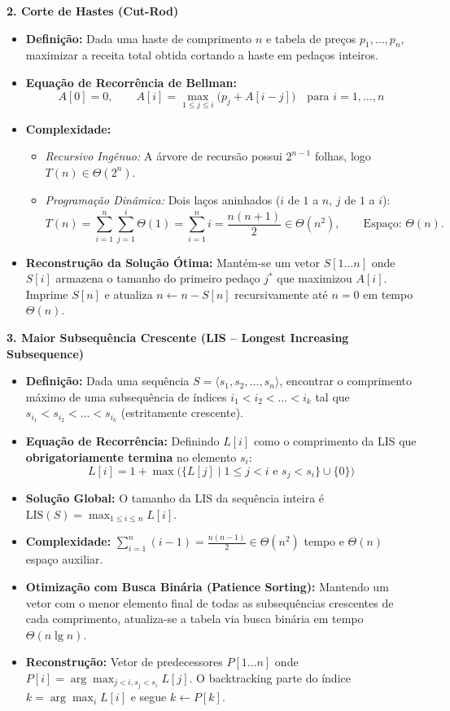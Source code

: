 \documentclass[11pt,a4paper]{article}
\newcommand{\topico}[1]{\par\medskip\textbf{\color{azul}#1}\par}
\begin{document}
\topico{2. Corte de Hastes (Cut-Rod)}
\begin{itemize}
  \item \textbf{Definição:} Dada uma haste de comprimento $n$ e tabela de preços $p_1, \dots, p_n$, maximizar a receita total obtida cortando a haste em pedaços inteiros.
  \item \textbf{Equação de Recorrência de Bellman:}
  \[
  \boxed{A[0] = 0, \qquad A[i] = \max_{1 \le j \le i} \big(p_j + A[i - j]\big) \quad \text{para } i = 1, \dots, n}
  \]
  \item \textbf{Complexidade:}
  \begin{itemize}
    \item \textit{Recursivo Ingênuo:} A árvore de recursão possui $2^{n-1}$ folhas, logo $T(n) \in \Theta(2^n)$.
    \item \textit{Programação Dinâmica:} Dois laços aninhados ($i$ de $1$ a $n$, $j$ de $1$ a $i$):
    \[
    T(n) = \sum_{i=1}^{n} \sum_{j=1}^{i} \Theta(1) = \sum_{i=1}^{n} i = \frac{n(n+1)}{2} \in \Theta(n^2), \qquad \text{Espaço: } \Theta(n).
    \]
  \end{itemize}
  \item \textbf{Reconstrução da Solução Ótima:} Mantém-se um vetor $S[1 \dots n]$ onde $S[i]$ armazena o tamanho do primeiro pedaço $j^*$ que maximizou $A[i]$. Imprime $S[n]$ e atualiza $n \leftarrow n - S[n]$ recursivamente até $n=0$ em tempo $\Theta(n)$.
\end{itemize}

\topico{3. Maior Subsequência Crescente (LIS -- Longest Increasing Subsequence)}
\begin{itemize}
  \item \textbf{Definição:} Dada uma sequência $S = \langle s_1, s_2, \dots, s_n \rangle$, encontrar o comprimento máximo de uma subsequência de índices $i_1 < i_2 < \dots < i_k$ tal que $s_{i_1} < s_{i_2} < \dots < s_{i_k}$ (estritamente crescente).
  \item \textbf{Equação de Recorrência:} Definindo $L[i]$ como o comprimento da LIS que \textbf{obrigatoriamente termina} no elemento $s_i$:
  \[
  \boxed{L[i] = 1 + \max \Big(\{L[j] \mid 1 \le j < i \text{ e } s_j < s_i\} \cup \{0\}\Big)}
  \]
  \item \textbf{Solução Global:} O tamanho da LIS da sequência inteira é $\text{LIS}(S) = \max_{1 \le i \le n} L[i]$.
  \item \textbf{Complexidade:} $\sum_{i=1}^{n} (i-1) = \frac{n(n-1)}{2} \in \Theta(n^2)$ tempo e $\Theta(n)$ espaço auxiliar.
  \item \textbf{Otimização com Busca Binária (Patience Sorting):} Mantendo um vetor com o menor elemento final de todas as subsequências crescentes de cada comprimento, atualiza-se a tabela via busca binária em tempo $\Theta(n \lg n)$.
  \item \textbf{Reconstrução:} Vetor de predecessores $P[1 \dots n]$ onde $P[i] = \arg\max_{j < i, s_j < s_i} L[j]$. O backtracking parte do índice $k = \arg\max_i L[i]$ e segue $k \leftarrow P[k]$.
\end{itemize}
\end{document}
